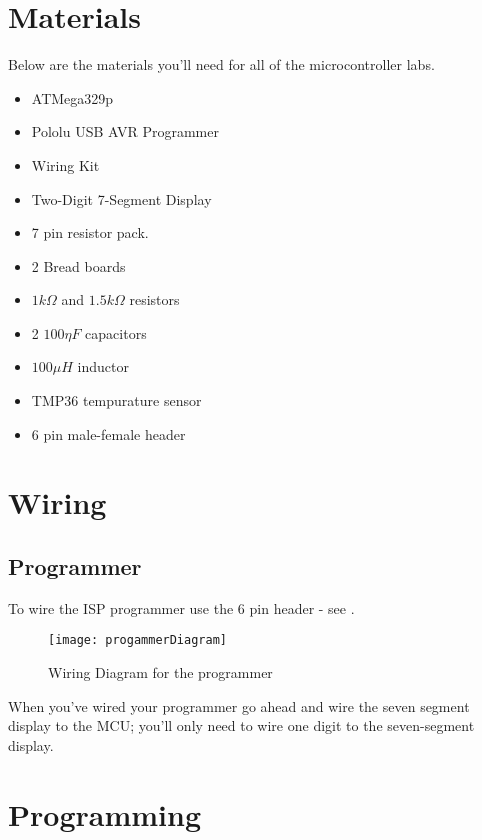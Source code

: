 \documentclass[main.tex]{subfile}
\begin{document}
\section{Materials}
\label{sub:materials}

Below are the materials you'll need for all of the microcontroller labs.

\begin{itemize}
	\item ATMega329p
	\item Pololu USB AVR Programmer
	\item Wiring Kit
	\item Two-Digit 7-Segment Display
	\item 7 pin resistor pack.
	\item 2 Bread boards
	\item $1k \Omega$ and $1.5k \Omega$ resistors
	\item 2 $100 \eta F$ capacitors
	\item $100 \mu H$ inductor
	\item TMP36 tempurature sensor
	\item 6 pin male-female header
\end{itemize}


\section{Wiring} 
\label{sec:wiring}

\subsection{Programmer}
\label{sub:programmer}

To wire the ISP programmer use the 6 pin header - see .

\begin{figure}[H]
	\begin{center}
		\texttt{[image: progammerDiagram]}
	\end{center}
	\caption{Wiring Diagram for the programmer}
	\label{fig:programmerDia}
\end{figure}

When you've wired your programmer go ahead and wire the seven segment
display to the MCU; you'll only need to wire one digit to the
seven-segment display.


\section{Programming} 
\label{sec:programming}
\end{document}
